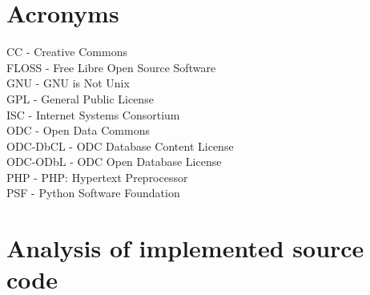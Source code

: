 \documentclass[11pt]{article}
\begin{document}
\section{Acronyms}

CC  - Creative Commons\\
FLOSS - Free Libre Open Source Software\\
GNU - GNU is Not Unix\\
GPL - General Public License\\
ISC - Internet Systems Consortium\\
ODC - Open Data Commons\\
ODC-DbCL - ODC Database Content License\\
ODC-ODbL - ODC Open Database License\\
PHP - PHP: Hypertext Preprocessor\\
PSF - Python Software Foundation
\newpage
\section{Analysis of implemented source code}
\end{document}
